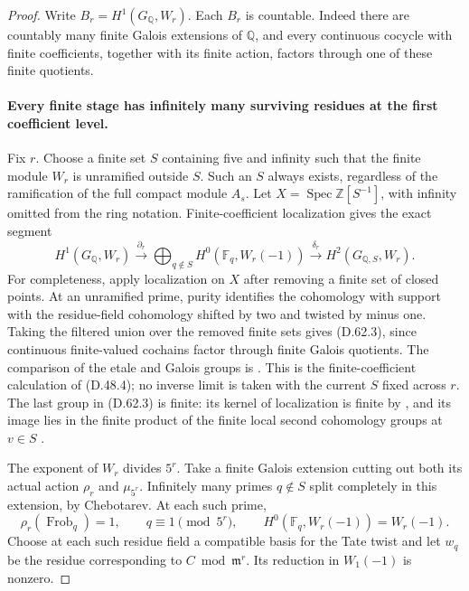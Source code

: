 \begin{proof}
Write \(B_r=H^1(G_{\mathbb Q},W_r)\). Each \(B_r\)
is countable. Indeed there are countably many finite
Galois extensions of \(\mathbb Q\), and every continuous
cocycle with finite coefficients, together with its finite
action, factors through one of these finite quotients.

\paragraph{Every finite stage has infinitely many surviving
residues at the first coefficient level.}
Fix \(r\). Choose a finite set \(S\) containing five and
infinity such that the finite module \(W_r\) is unramified
outside \(S\). Such an \(S\) always exists, regardless of
the ramification of the full compact module \(A_s\).
Let \(X=\operatorname{Spec}\mathbb Z[S^{-1}]\), with
infinity omitted from the ring notation. Finite-coefficient
localization gives the exact segment
\[
 H^1(G_{\mathbb Q},W_r)
 \xrightarrow{\partial_r}
 \bigoplus_{q\notin S}H^0(\mathbb F_q,W_r(-1))
 \xrightarrow{\delta_r} H^2(G_{\mathbb Q,S},W_r).
                                                        \tag{D.62.3}
\]
For completeness, apply localization on \(X\) after
removing a finite set of closed points. At an unramified
prime, purity identifies the cohomology with support
with the residue-field cohomology shifted by two and
twisted by minus one. Taking the filtered union over
the removed finite sets gives (D.62.3), since continuous
finite-valued cochains factor through finite Galois
quotients. The comparison of the etale and Galois groups
is \cite[II, Proposition 2.9]{DE_MilneADT}. This is the
finite-coefficient calculation of (D.48.4); no inverse
limit is taken with the current \(S\) fixed across \(r\).
The last group in (D.62.3) is finite: its kernel of
localization is finite by
\cite[I, Theorem 4.10(a)]{DE_MilneADT}, and its image
lies in the finite product of the finite local second
cohomology groups at \(v\in S\)
\cite[I, Corollary 2.3]{DE_MilneADT}.

The exponent of \(W_r\) divides \(5^r\). Take a finite
Galois extension cutting out both its actual action
\(\rho_r\) and \(\mu_{5^r}\). Infinitely many primes
\(q\notin S\) split completely in this extension, by
Chebotarev. At each such prime,
\[
 \rho_r(\operatorname{Frob}_q)=1,
 \qquad q\equiv1\pmod{5^r},
 \qquad H^0(\mathbb F_q,W_r(-1))=W_r(-1).
                                                        \tag{D.62.4}
\]
Choose at each such residue field a compatible basis
for the Tate twist and let \(w_q\) be the residue
corresponding to \(C\bmod\mathfrak m^r\). Its reduction
in \(W_1(-1)\) is nonzero.


\end{proof}
